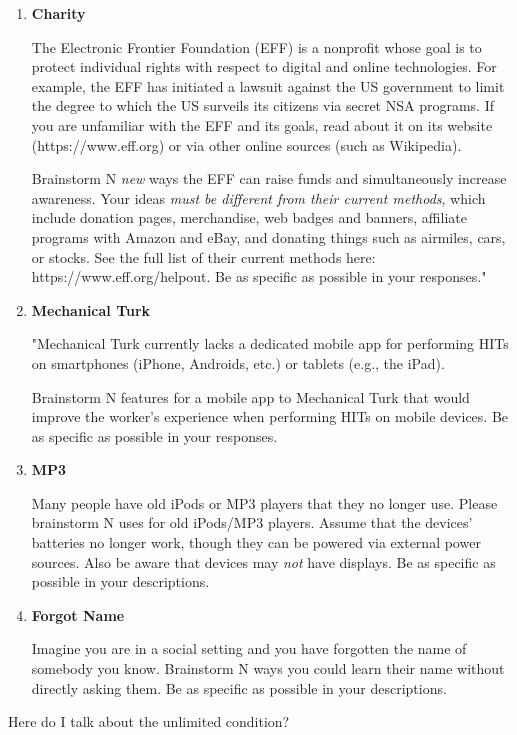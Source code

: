 \begin{enumerate}
\item \textbf{Charity}

The Electronic Frontier Foundation (EFF) is a nonprofit whose goal is to protect individual rights with respect to digital and online technologies. For example, the EFF has initiated a lawsuit against the US government to limit the degree to which the US surveils its citizens via secret NSA programs. If you are unfamiliar with the EFF and its goals, read about it on its website (https://www.eff.org) or via other online sources (such as Wikipedia).

Brainstorm N \emph{new} ways the EFF can raise funds and simultaneously increase awareness. Your ideas \emph{must be different from their current methods}, which include donation pages, merchandise, web badges and banners, affiliate programs with Amazon and eBay, and donating things such as airmiles, cars, or stocks. See the full list of their current methods here: https://www.eff.org/helpout. Be as specific as possible in your responses."

\item \textbf{Mechanical Turk}

"Mechanical Turk currently lacks a dedicated mobile app for performing HITs on smartphones (iPhone, Androids, etc.) or tablets (e.g., the iPad).

Brainstorm N features for a mobile app to Mechanical Turk that would improve the worker's experience when performing HITs on mobile devices. Be as specific as possible in your responses.

\item \textbf{MP3}

Many people have old iPods or MP3 players that they no longer use. Please brainstorm N uses for old iPods/MP3 players. Assume that the devices' batteries no longer work, though they can be powered via external power sources. Also be aware that devices may \emph{not} have displays. Be as specific as possible in your descriptions.

\item \textbf{Forgot Name}

Imagine you are in a social setting and you have forgotten the name of somebody you know. Brainstorm N ways you could learn their name without directly asking them. Be as specific as possible in your descriptions.

\end{enumerate}

Here do I talk about the unlimited condition?

